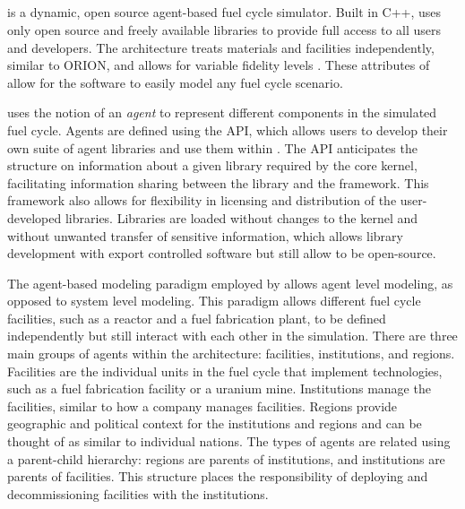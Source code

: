 \subsection{\Cyclus}
\Cyclus is a dynamic, open source agent-based fuel cycle simulator. Built 
in C++, \Cyclus uses only open source and freely available libraries to 
provide full access to all users and developers. The 
\Cyclus architecture treats materials and facilities independently, similar 
to ORION, and allows 
for variable fidelity levels \cite{huff_fundamental_2016}. These attributes
of \Cyclus allow for the software to easily model any fuel cycle scenario.

\Cyclus uses the notion of an \textit{agent} to represent different 
components in the simulated fuel cycle. Agents are 
defined using the \Cyclus \gls{API}, which allows users 
to develop their own suite of agent libraries and use them within \Cyclus. 
The \gls{API} anticipates the structure on information about a given 
library 
required by the core \Cyclus kernel, facilitating 
information sharing between the library and the \Cyclus framework. 
This framework 
also allows for flexibility in licensing and distribution of the 
user-developed libraries. Libraries are loaded without changes to the \Cyclus 
kernel and without unwanted transfer of sensitive information, which 
allows library development with export controlled 
software but still allow \Cyclus to be open-source.

The agent-based modeling paradigm employed by \Cyclus allows agent level 
modeling, as opposed to system level modeling. This paradigm allows different 
fuel cycle facilities, such as a reactor and a fuel fabrication plant, to 
be defined independently but still interact with each other in the 
simulation. There are three main groups of agents within the \Cyclus 
architecture: facilities, institutions, and regions. Facilities are 
the individual units in the fuel cycle that implement technologies, 
such as a fuel fabrication facility or a uranium mine. Institutions 
manage the facilities, similar to how a company manages facilities. 
Regions provide geographic 
and political context for the institutions and regions and can be thought 
of as similar to individual nations. The types of agents are related using 
a parent-child hierarchy: regions are
parents of institutions, and institutions are parents of facilities. This 
structure places the responsibility of deploying and decommissioning 
facilities with the institutions. 

